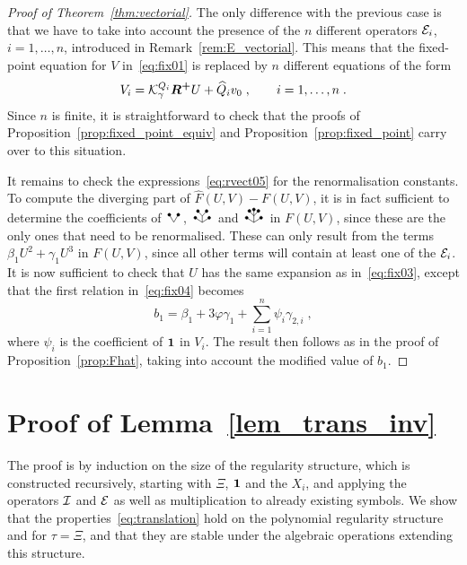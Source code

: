 \documentclass[reqno,11pt]{article}
\def\unit{\vone}
\def\Rplus{\boldsymbol{R^+}}
\begin{document}
\begin{proof}[Proof of Theorem~\ref{thm:vectorial}]
The only difference with the previous case is that we have to take into account
the presence of the $n$ different operators ${\mathcal E}_i$, $i=1,\dots,n$, introduced
in Remark~\ref{rem:E_vectorial}. This means that the fixed-point equation for
$V$ in~\eqref{eq:fix01} is replaced by $n$ different equations of the form 
\[
 V_i = \cK^{Q_i}_\gamma \Rplus U + \widehat Q_iv_0\;, 
\qquad i=1,\dots,n\;.
\]
Since $n$ is finite, it is straightforward to check that the proofs of
Proposition~\ref{prop:fixed_point_equiv} and Proposition~\ref{prop:fixed_point}
carry over to this situation. 

It remains to check the expressions~\eqref{eq:rvect05} for the renormalisation
constants. To compute the diverging part of $\widehat F(U,V) - F(U,V)$, it is
in fact sufficient to determine the coefficients of $\RSV$, $\RSWV$ and $\RSWW$
in $F(U,V)$, since these are the only ones that need to be renormalised. These
can only result from the terms $\beta_1 U^2 + \gamma_1 U^3$ in $F(U,V)$, since
all other terms will contain at least one of the ${\mathcal E}_i$. It is now sufficient
to check that $U$ has the same expansion as in~\eqref{eq:fix03}, except that the
first relation in~\eqref{eq:fix04} becomes 
\[
 b_1 = \beta_1 + 3\varphi\gamma_1 + \sum_{i=1}^n \psi_i \gamma_{2,i}\;,
\]
where $\psi_i$ is the coefficient of $\unit$ in $V_i$. The result then follows 
as in the proof of Proposition~\ref{prop:Fhat}, taking into account the
modified value of $b_1$. 
\end{proof}




\appendix


\section{Proof of Lemma~\ref{lem_trans_inv}}
\label{app_proof_translation}

The proof is by induction on the size of the regularity structure, which is
constructed recursively, starting with $\Xi$, $\unit$ and the $X_i$, and
applying the operators ${\mathcal I}$ and ${\mathcal E}$ as well as multiplication to already
existing symbols. We show that the properties~\eqref{eq:translation}
hold on the polynomial regularity structure and for $\tau=\Xi$, and that they
are stable under the algebraic operations extending this structure. 
\end{document}
